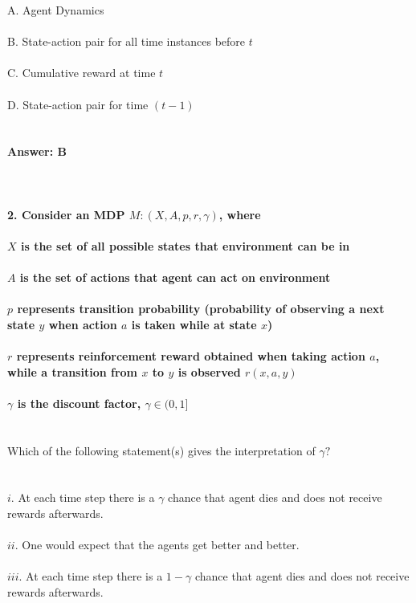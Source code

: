 \documentclass[prl,twocolumn,showpacs,preprintnumbers,superscriptaddress]{revtex4}
\theoremstyle{plain}
\theoremstyle{definition}
\begin{document}
\begin{widetext}
A. Agent Dynamics
\\
\\
B. State-action pair for all time instances before $t$
\\
\\
C. Cumulative reward at time $t$
\\
\\
D. State-action pair for time $(t-1)$
\\
\\
\\
\textbf{Answer: B}
\\
\\
\\
\\
\textbf{2. Consider an MDP $M: (X, A, p,r, \gamma)$, where\\ \\
$X$ is the set of all possible states that environment can be in \\ \\
$A$ is the set of actions that agent can act on environment \\ \\
$p$ represents transition probability (probability of observing a next state $y$ when action $a$ is taken while at state $x$)
\\
\\
$r$ represents reinforcement reward obtained when taking
action $a$, while a transition from $x$ to $y$ is observed $r(x, a, y)$
\\
\\
$\gamma$ is the discount factor, $\gamma \in (0, 1]$}
\\
\\
\\
Which of the following statement(s) gives the interpretation of $\gamma?$
\\
\\
\\
$i$. At each time step there is a $\gamma$ chance that agent dies and does not receive rewards afterwards.
\\
\\
$ii$. One would expect that the agents get better and better. 
\\
\\
$iii$. At each time step there is a $1 - \gamma$ chance that agent dies and does not receive rewards afterwards.
\\
\\
\\
\\

\end{widetext}
\end{document}
